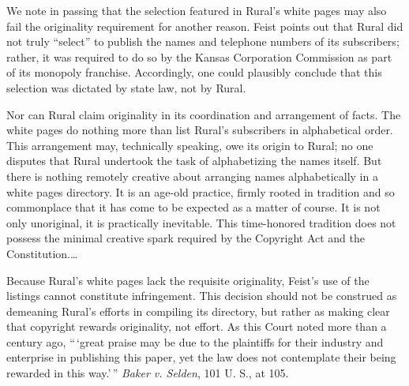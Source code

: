 We note in passing that the selection featured in Rural's white pages may also
fail the originality requirement for another reason. Feist points out that
Rural did not truly ``select'' to publish the names and telephone numbers of
its subscribers; rather, it was required to do so by the Kansas Corporation
Commission as part of its monopoly franchise. Accordingly, one could plausibly
conclude that this selection was dictated by state law, not by Rural.

Nor can Rural claim originality in its coordination and arrangement of facts.
The white pages do nothing more than list Rural's subscribers in alphabetical
order. This arrangement may, technically speaking, owe its origin to Rural; no
one disputes that Rural undertook the task of alphabetizing the names itself.
But there is nothing remotely creative about arranging names alphabetically in
a white pages directory. It is an age-old practice, firmly rooted in tradition
and so commonplace that it has come to be expected as a matter of course. It is
not only unoriginal, it is practically inevitable. This time-honored tradition
does not possess the minimal creative spark required by the Copyright Act and
the Constitution.\ldots

Because Rural's white pages lack the requisite originality, Feist's use of the
listings cannot constitute infringement. This decision should not be construed
as demeaning Rural's efforts in compiling its directory, but rather as making
clear that copyright rewards originality, not effort. As this Court noted more
than a century ago, ``\,`great praise may be due to the
plaintiffs for their industry and enterprise in publishing this paper, yet the
law does not contemplate their being rewarded in this way.'\,'' \textit{Baker
v. Selden}, 101 U. S., at 105.

